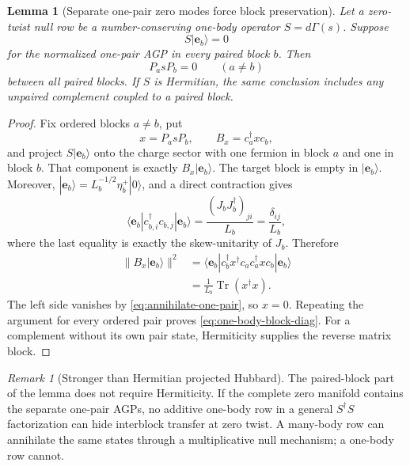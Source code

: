 \documentclass[11pt]{article}
\newtheorem{lemma}[theorem]{Lemma}
\theoremstyle{remark}
\newtheorem{remark}[theorem]{Remark}
\newcommand{\Tr}{\operatorname{Tr}}
\newcommand{\be}{\mathbf e}
\begin{document}
\begin{lemma}[Separate one-pair zero modes force block preservation]
\label{lem:one-pair-rigidity}
Let a zero-twist null row be a number-conserving one-body operator
$S=d\Gamma(s)$.  Suppose
\begin{equation}
 S|\be_b\rangle=0
 \label{eq:annihilate-one-pair}
\end{equation}
for the normalized one-pair AGP in every paired block $b$.  Then
\begin{equation}
 P_asP_b=0
 \qquad(a\ne b)
 \label{eq:one-body-block-diag}
\end{equation}
between all paired blocks.  If $S$ is Hermitian, the same conclusion includes
any unpaired complement coupled to a paired block.
\end{lemma}

\begin{proof}
Fix ordered blocks $a\ne b$, put
\begin{equation}
 x=P_asP_b,
 \qquad
 B_x=c_a^\dagger xc_b,
\end{equation}
and project $S|\be_b\rangle$ onto the charge sector with one fermion in block
$a$ and one in block $b$.  That component is exactly $B_x|\be_b\rangle$.
The target block is empty in $|\be_b\rangle$.  Moreover,
$|\be_b\rangle=L_b^{-1/2}\eta_b^+|0\rangle$, and a direct contraction gives
\begin{equation}
 \langle\be_b|c_{b,i}^\dagger c_{b,j}|\be_b\rangle
 =\frac{(J_bJ_b^\dagger)_{ji}}{L_b}
 =\frac{\delta_{ij}}{L_b},
 \label{eq:onepair-rdm}
\end{equation}
where the last equality is exactly the skew-unitarity of $J_b$.  Therefore
\begin{align}
 \|B_x|\be_b\rangle\|^2
 &=\langle\be_b|
 c_b^\dagger x^\dagger c_ac_a^\dagger xc_b
 |\be_b\rangle\nonumber\\
 &=\frac1{L_b}\Tr(x^\dagger x).
 \label{eq:transfer-norm}
\end{align}
The left side vanishes by \eqref{eq:annihilate-one-pair}, so $x=0$.
Repeating the argument for every ordered pair proves
\eqref{eq:one-body-block-diag}.  For a complement without its own pair state,
Hermiticity supplies the reverse matrix block.
\end{proof}

\begin{remark}[Stronger than Hermitian projected Hubbard]
The paired-block part of the lemma does not require Hermiticity.  If the
complete zero manifold contains the separate one-pair AGPs, no additive
one-body row in a general $S^\dagger S$ factorization can hide interblock
transfer at zero twist.  A many-body row can annihilate the same states through
a multiplicative null mechanism; a one-body row cannot.
\end{remark}
\end{document}
